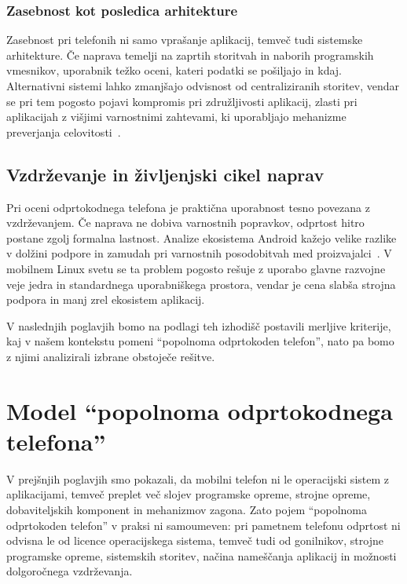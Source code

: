 \documentclass[a4paper,12pt,openright]{book}
\begin{document}
\subsection{Zasebnost kot posledica arhitekture}
\label{subsec:teorija_zasebnost}

Zasebnost pri telefonih ni samo vprašanje aplikacij, temveč tudi sistemske arhitekture.
Če naprava temelji na zaprtih storitvah in naborih programskih vmesnikov, uporabnik težko oceni, kateri podatki se pošiljajo in kdaj.
Alternativni sistemi lahko zmanjšajo odvisnost od centraliziranih storitev, vendar se pri tem pogosto pojavi kompromis pri združljivosti aplikacij, zlasti pri aplikacijah z višjimi varnostnimi zahtevami, ki uporabljajo mehanizme preverjanja celovitosti~\cite{play_integrity_overview}.

\section{Vzdrževanje in življenjski cikel naprav}
\label{sec:teorija_vzdrzevanje}

Pri oceni odprtokodnega telefona je praktična uporabnost tesno povezana z vzdrževanjem.
Če naprava ne dobiva varnostnih popravkov, odprtost hitro postane zgolj formalna lastnost.
Analize ekosistema Android kažejo velike razlike v dolžini podpore in zamudah pri varnostnih posodobitvah med proizvajalci~\cite{acar_android_security_updates_2024}.
V mobilnem Linux svetu se ta problem pogosto rešuje z uporabo glavne razvojne veje jedra in standardnega uporabniškega prostora, vendar je cena slabša strojna podpora in manj zrel ekosistem aplikacij.

V naslednjih poglavjih bomo na podlagi teh izhodišč postavili merljive kriterije, kaj v našem kontekstu pomeni \enquote{popolnoma odprtokoden telefon}, nato pa bomo z njimi analizirali izbrane obstoječe rešitve.

\chapter{Model \enquote{popolnoma odprtokodnega telefona}}
\label{chap:model_odprtokodnega_telefona}

V prejšnjih poglavjih smo pokazali, da mobilni telefon ni le operacijski sistem z aplikacijami, temveč preplet več slojev programske opreme, strojne opreme, dobaviteljskih komponent in mehanizmov zagona.
Zato pojem \enquote{popolnoma odprtokoden telefon} v praksi ni samoumeven: pri pametnem telefonu odprtost ni odvisna le od licence operacijskega sistema, temveč tudi od gonilnikov, strojne programske opreme, sistemskih storitev, načina nameščanja aplikacij in možnosti dolgoročnega vzdrževanja.
\end{document}
